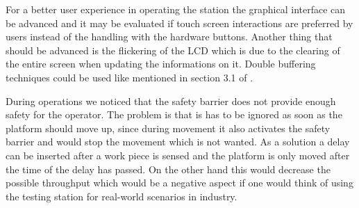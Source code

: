 For a better user experience in operating the station the graphical interface can be advanced and it may be evaluated if touch screen interactions are preferred by users instead of the handling with the hardware buttons. Another thing that should be advanced is the flickering of the LCD which is due to the clearing of the entire screen when updating the informations on it. Double buffering techniques could be used like mentioned in section 3.1 of \cite{Wilson:2013}.

During operations we noticed that the safety barrier does not provide enough safety for the operator. The problem is that is has to be ignored as soon as the platform should move up, since during movement it also activates the safety barrier and would stop the movement which is not wanted. As a solution a delay can be inserted after a work piece is sensed and the platform is only moved after the time of the delay has passed. On the other hand this would decrease the possible throughput which would be a negative aspect if one would think of using the testing station for real-world scenarios in industry.

